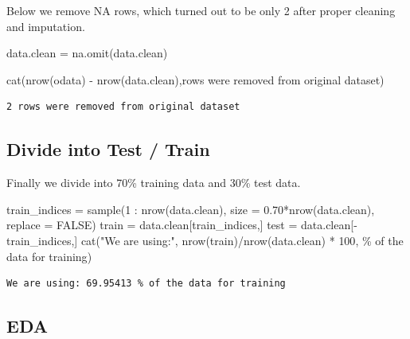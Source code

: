 \documentclass[
  letterpaper,
  DIV=11,
  numbers=noendperiod]{scrartcl}
\newenvironment{Shaded}{\begin{snugshade}}{\end{snugshade}}
\newcommand{\AttributeTok}[1]{\textcolor[rgb]{0.40,0.45,0.13}{#1}}
\newcommand{\ConstantTok}[1]{\textcolor[rgb]{0.56,0.35,0.01}{#1}}
\newcommand{\DecValTok}[1]{\textcolor[rgb]{0.68,0.00,0.00}{#1}}
\newcommand{\FloatTok}[1]{\textcolor[rgb]{0.68,0.00,0.00}{#1}}
\newcommand{\FunctionTok}[1]{\textcolor[rgb]{0.28,0.35,0.67}{#1}}
\newcommand{\NormalTok}[1]{\textcolor[rgb]{0.00,0.23,0.31}{#1}}
\newcommand{\OtherTok}[1]{\textcolor[rgb]{0.00,0.23,0.31}{#1}}
\newcommand{\SpecialCharTok}[1]{\textcolor[rgb]{0.37,0.37,0.37}{#1}}
\newcommand{\StringTok}[1]{\textcolor[rgb]{0.13,0.47,0.30}{#1}}
\begin{document}
Below we remove NA rows, which turned out to be only 2 after proper
cleaning and imputation.

\begin{Shaded}
\begin{Highlighting}[]
\NormalTok{data.clean }\OtherTok{=} \FunctionTok{na.omit}\NormalTok{(data.clean)}

\FunctionTok{cat}\NormalTok{(}\FunctionTok{nrow}\NormalTok{(odata) }\SpecialCharTok{{-}} \FunctionTok{nrow}\NormalTok{(data.clean),}\StringTok{\textquotesingle{}rows were removed from original dataset\textquotesingle{}}\NormalTok{)}
\end{Highlighting}
\end{Shaded}

\begin{verbatim}
2 rows were removed from original dataset
\end{verbatim}

\subsection{Divide into Test / Train}\label{divide-into-test-train}

Finally we divide into 70\% training data and 30\% test data.

\begin{Shaded}
\begin{Highlighting}[]
\NormalTok{train\_indices }\OtherTok{=} \FunctionTok{sample}\NormalTok{(}\DecValTok{1} \SpecialCharTok{:} \FunctionTok{nrow}\NormalTok{(data.clean), }\AttributeTok{size =} \FloatTok{0.70}\SpecialCharTok{*}\FunctionTok{nrow}\NormalTok{(data.clean), }\AttributeTok{replace =} \ConstantTok{FALSE}\NormalTok{)}
\NormalTok{train }\OtherTok{=}\NormalTok{ data.clean[train\_indices,]}
\NormalTok{test }\OtherTok{=}\NormalTok{ data.clean[}\SpecialCharTok{{-}}\NormalTok{train\_indices,]}
\FunctionTok{cat}\NormalTok{(}\StringTok{"We are using:"}\NormalTok{, }\FunctionTok{nrow}\NormalTok{(train)}\SpecialCharTok{/}\FunctionTok{nrow}\NormalTok{(data.clean) }\SpecialCharTok{*} \DecValTok{100}\NormalTok{, }\StringTok{\textquotesingle{}\% of the data for training\textquotesingle{}}\NormalTok{)}
\end{Highlighting}
\end{Shaded}

\begin{verbatim}
We are using: 69.95413 % of the data for training
\end{verbatim}

\subsection{EDA}\label{eda}
\end{document}
